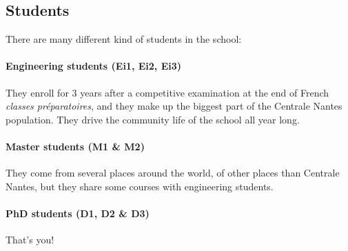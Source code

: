 \subsection{Students}\trad
There are many different kind of students in the school:
\paragraph{Engineering students (Ei1, Ei2, Ei3)} They enroll for 3 years after a competitive examination at the end of French \textit{classes préparatoires}, and they make up the biggest part of the Centrale Nantes population. They drive the community life of the school all year long. %
\paragraph{Master students (M1 \& M2)} They come from several places around the world, of other places than Centrale Nantes, but they share some courses with engineering students. %
\paragraph{PhD students (D1, D2 \& D3)} That's you!

